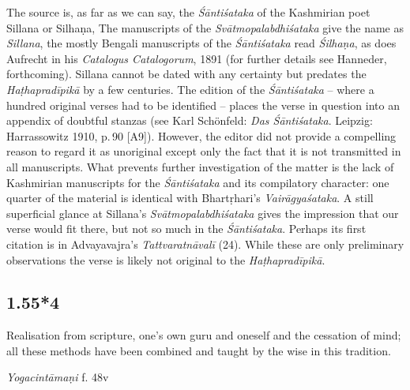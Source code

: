 \begin{ekdosis}
\begin{philcomm}[hp01_055_3]
The source is, as far as we can say, the \emph{Śāntiśataka} of the Kashmirian poet Sillana or Silhaṇa, The manuscripts of the \emph{Svātmopalabdhiśataka} give the name as \emph{Sillana}, the mostly Bengali manuscripts of the \emph{Śāntiśataka} read \emph{Śilhaṇa}, as does Aufrecht in his \emph{Catalogus Catalogorum}, 1891 (for further details see Hanneder, forthcoming). Sillana cannot be dated with any certainty but predates the \emph{Haṭhapradīpikā} by a few centuries. The
edition of the \emph{Śāntiśataka} – where a hundred original verses had to be identified – places the verse in question into an appendix of doubtful stanzas (see Karl Schönfeld: \emph{Das Śāntiśataka}. Leipzig: Harrassowitz 1910, p.\,90 [A9]). However, the editor did not provide a compelling reason to regard it as
unoriginal except only the fact that it is not transmitted in all manuscripts. What prevents further investigation of the matter is the lack of Kashmirian manuscripts for the \emph{Śāntiśataka} and its compilatory character: one quarter of the material is identical with Bhartṛhari's \emph{Vairāgyaśataka}. A still superficial glance at Sillana's \emph{Svātmopalabdhiśataka} gives the impression that our verse would fit there, but not so much in the \emph{Śāntiśataka}. Perhaps its first citation is in Advayavajra’s \emph{Tattva\-ratnāvalī} (24). While
these are only preliminary observations the verse is likely not original to the \emph{Haṭhapradīpikā}.
\end{philcomm}

\subsection*{1.55*4}
\begin{translation}[hp01_055_4]
Realisation from scripture, one's own guru and oneself and the cessation of mind; all these methods have been combined and taught by the wise in this tradition.%
\end{translation}


\begin{testimonia}[hp01_055_4]
\emph{Yogacintāmaṇi} f. 48v

\begin{versinnote}
\end{versinnote}


\end{testimonia}
\end{ekdosis}

